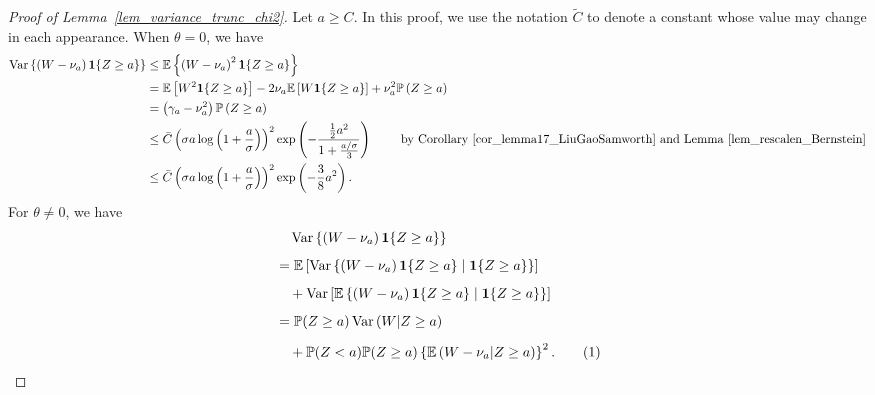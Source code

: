 \documentclass{article}
\newcommand{\one}{\mathbf{1}}
\newcommand\numberthis{\addtocounter{equation}{1}\tag{\theequation}}
\begin{document}
\begin{proof}[Proof of Lemma~\ref{lem_variance_trunc_chi2}]
    
Let $a \geq C$. In this proof, we use the notation $\tilde C$ to denote a constant whose value may change in each appearance. 
When $\theta=0$, we have 
$$
\begin{aligned}
\operatorname{Var}\left\{\left(W-\nu_{a}\right) \one{\{Z \geq a\}}\right\} & \leq \mathbb{E}\left\{\left(W-\nu_{a}\right)^{2} \one{\{Z \geq a\}}\right\}\\
& = \mathbb E\left[W^2\one{\{Z \geq a\}}\right] - 2 \nu_a \mathbb E\left[W \one{\{Z \geq a\}}\right] + \nu_a^2 \mathbb P\left(Z\geq a\right)\\
& = \left(\gamma_a - \nu_a^2\right)\mathbb P\left(Z\geq a\right)\\
& \leq \bar C \left( \sigma a \log\left(1+ \frac{a}{\sigma}\right)\right)^2 \exp\left(-\frac{\frac{1}{2} a^2}{1+ \frac{a/\sigma}{3}}\right) \qquad \text{ by Corollary~\ref{cor_lemma17_LiuGaoSamworth} and Lemma~\ref{lem_rescalen_Bernstein}}\\
& \leq \bar C \left( \sigma a \log\left(1+ \frac{a}{\sigma}\right)\right)^2 \exp\left(-\frac{3}{8}a^2\right).
\end{aligned}
$$
For $\theta \neq 0$, we have
\begin{align*}
& \quad \operatorname{Var}\left\{\left(W-\nu_{a}\right) \one{\{Z \geq a\}}\right\} \\[5pt]
& =\mathbb{E}\left[\operatorname{Var}\left\{\left(W-\nu_{a}\right) \one{\{Z \geq a\}} \mid \one{\{Z \geq a\}}\right\}\right] \\[5pt]
& \quad+\operatorname{Var}\left[\mathbb{E}\left\{\left(W-\nu_{a}\right) \one{\{Z \geq a\}} \mid \one{\{Z \geq a\}}\right\}\right] \\[5pt]
& =\mathbb{P}(Z \geq a) \operatorname{Var}\left(W| Z \geq a\right)  \\[5pt]
& \quad+\mathbb{P}(Z<a) \mathbb{P}(Z \geq a)\left\{\mathbb{E}\left(W-\nu_{a}|Z \geq a\right)\right\}^{2}.\numberthis\label{eq_decomp_variance_H1}
\end{align*}




\end{proof}
\end{document}
